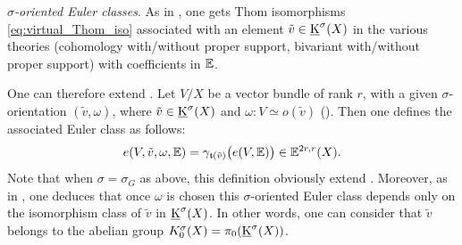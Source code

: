 \begin{num}\textit{$\sigma$-oriented Euler classes}.\label{num:sigma-Thom&Euler}
As in , one gets Thom isomorphisms \eqref{eq:virtual_Thom_iso}
 associated with an element $\tilde v \in \operatorname{\underline K}^\sigma(X)$ in the various theories
 (cohomology with/without proper support, bivariant with/without proper support)
 with coefficients in $\mathbb E$.

One can therefore extend .
 Let $V/X$ be a vector bundle of rank $r$,
  with a given $\sigma$-orientation $(\tilde v,\omega)$, where $\tilde v \in \operatorname{\underline K}^{\sigma}(X)$ and $\omega:V\simeq o(\tilde v)$
  (). Then one defines the associated Euler class as follows:
$$
e(V,\tilde v,\omega,\mathbb E)=\gamma_{\mathfrak{t}(\tilde v)}\big(e(V,\mathbb E)\big) \in \mathbb E^{2r,r}(X).
$$
Note that when $\sigma=\sigma_G$ as above, this definition obviously extend
 .
 Moreover, as in ,
 one deduces that once $\omega$ is chosen this $\sigma$-oriented Euler class depends only on the isomorphism
 class of $\tilde v$ in $\operatorname{\underline K}^\sigma(X)$. In other words,
 one can consider that $\tilde v$ belongs to the abelian group
 $K_0^\sigma(X)=\pi_0(\operatorname{\underline K}^\sigma(X))$.
\end{num}



%
